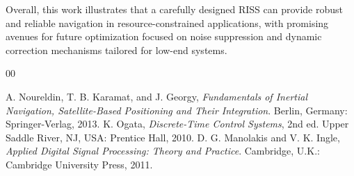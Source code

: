 \documentclass[conference]{IEEEtran}
\begin{document}
Overall, this work illustrates that a carefully designed RISS can provide robust and reliable navigation in resource-constrained applications, with promising avenues for future optimization focused on noise suppression and dynamic correction mechanisms tailored for low-end systems.


\begin{thebibliography}{00}

 A. Noureldin, T. B. Karamat, and J. Georgy, \textit{Fundamentals of Inertial Navigation, Satellite-Based Positioning and Their Integration}. Berlin, Germany: Springer-Verlag, 2013.
 K. Ogata, \textit{Discrete-Time Control Systems}, 2nd ed. Upper Saddle River, NJ, USA: Prentice Hall, 2010.
 D. G. Manolakis and V. K. Ingle, \textit{Applied Digital Signal Processing: Theory and Practice}. Cambridge, U.K.: Cambridge University Press, 2011.



\end{thebibliography}
\end{document}
